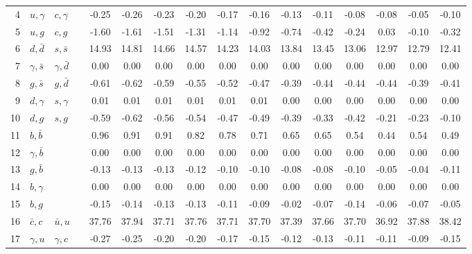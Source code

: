 \begin{tabularx}{\textwidth}{rXXX@{}S@{}S@{}S@{}S@{}S@{}S@{}S@{}S@{}S@{}S@{}S@{}S}
  4 & $u,\gamma$       & $c,\gamma$       &                 & -0.25 & -0.26 & -0.23 & -0.20 & -0.17 & -0.16 & -0.13 & -0.11 & -0.08 & -0.08 & -0.05 & -0.10 \\
  5 & $u,g$            & $c,g$            &                 & -1.60 & -1.61 & -1.51 & -1.31 & -1.14 & -0.92 & -0.74 & -0.42 & -0.24 &  0.03 & -0.10 & -0.32 \\
  6 & $d,\bar d$       & $s,\bar s$       &                 & 14.93 & 14.81 & 14.66 & 14.57 & 14.23 & 14.03 & 13.84 & 13.45 & 13.06 & 12.97 & 12.79 & 12.41 \\
  7 & $\gamma, \bar s$ & $\gamma, \bar d$ &                 &  0.00 &  0.00 &  0.00 &  0.00 &  0.00 &  0.00 &  0.00 &  0.00 &  0.00 &  0.00 &  0.00 &  0.00 \\
  8 & $g,\bar s$       & $g,\bar d$       &                 & -0.61 & -0.62 & -0.59 & -0.55 & -0.52 & -0.47 & -0.39 & -0.44 & -0.44 & -0.44 & -0.39 & -0.41 \\
  9 & $d,\gamma$       & $s,\gamma$       &                 &  0.01 &  0.01 &  0.01 &  0.01 &  0.01 &  0.01 &  0.00 &  0.00 &  0.00 &  0.00 &  0.00 &  0.00 \\
 10 & $d,g$            & $s,g$            &                 & -0.59 & -0.62 & -0.56 & -0.54 & -0.47 & -0.49 & -0.39 & -0.33 & -0.42 & -0.21 & -0.23 & -0.10 \\
 11 & $b,\bar b$       &                  &                 &  0.96 &  0.91 &  0.91 &  0.82 &  0.78 &  0.71 &  0.65 &  0.65 &  0.54 &  0.44 &  0.54 &  0.49 \\
 12 & $\gamma,\bar b$  &                  &                 &  0.00 &  0.00 &  0.00 &  0.00 &  0.00 &  0.00 &  0.00 &  0.00 &  0.00 &  0.00 &  0.00 &  0.00 \\
 13 & $g,\bar b$       &                  &                 & -0.13 & -0.13 & -0.13 & -0.12 & -0.10 & -0.10 & -0.08 & -0.08 & -0.10 & -0.05 & -0.04 & -0.11 \\
 14 & $b,\gamma$       &                  &                 &  0.00 &  0.00 &  0.00 &  0.00 &  0.00 &  0.00 &  0.00 &  0.00 &  0.00 &  0.00 &  0.00 &  0.00 \\
 15 & $b,g$            &                  &                 & -0.15 & -0.14 & -0.13 & -0.13 & -0.11 & -0.09 & -0.02 & -0.07 & -0.14 & -0.06 & -0.07 & -0.05 \\
 16 & $\bar c,c$       & $\bar u,u$       &                 & 37.76 & 37.94 & 37.71 & 37.76 & 37.71 & 37.70 & 37.39 & 37.66 & 37.70 & 36.92 & 37.88 & 38.42 \\
 17 & $\gamma, u$      & $\gamma, c$      &                 & -0.27 & -0.25 & -0.20 & -0.20 & -0.17 & -0.15 & -0.12 & -0.13 & -0.11 & -0.11 & -0.09 & -0.15 \\

\end{tabularx}
